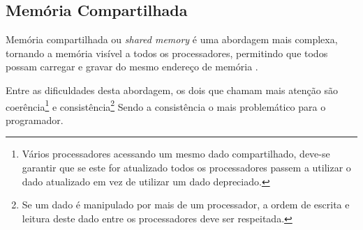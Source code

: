 \subsection{Memória Compartilhada}

Memória compartilhada ou \textit{shared memory} é uma abordagem mais complexa, 
tornando a memória visível a todos os processadores, permitindo que 
todos possam carregar e gravar do mesmo endereço de memória \cite[2.2]{sopc}. 

Entre as dificuldades desta abordagem, os dois que chamam mais atenção são
coerência\footnote{Vários 
        processadores acessando um mesmo dado compartilhado, deve-se
                garantir que se este for atualizado todos os processadores
                passem a utilizar o dado atualizado em vez de utilizar um dado
                depreciado.
} 
e consistência\footnote{Se 
        um dado é manipulado por mais de um processador,
        a ordem de escrita e leitura deste dado entre os processadores deve 
                ser respeitada.
}
Sendo a consistência o mais problemático para o programador.





